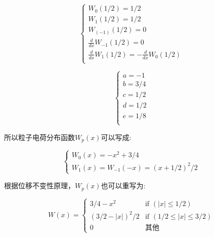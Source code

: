 \begin{equation}
\begin{cases*}
W_0(1/2)=1/2  \\
W_1(1/2)=1/2  \\
W_(-1)(1/2)=0 \\
\frac{d}{dx} W_{-1}(1/2)=0  \\
\frac{d}{dx} W_{1}(1/2)=-\frac{d}{dx} W_{0}(1/2)  \\
\end{cases*}
\end{equation} 



\begin{equation}
\begin{cases*}
a=-1    \\
b=3/4  \\
c=1/2  \\
d=1/2  \\
e=1/8  \\
\end{cases*}
\end{equation} 

所以粒子电荷分布函数$W_p(x)$可以写成:

\begin{equation}
\begin{cases*}
W_0(x)=-x^2+3/4    \\
W_1(x)=W_{-1}(-x)=(x+1/2)^2/2
\end{cases*}
\end{equation}




根据位移不变性原理，$W_p(x)$也可以重写为:

\begin{equation}
 W(x) =
  \begin{cases}
   3/4-x^2 & \text{if } (|x| \leq 1/2) \\
   (3/2-|x|)^2/2 & \text{if } (1/2 \leq |x| \leq 3/2) \\
    0 & \text{其他}
  \end{cases}
\end{equation}


